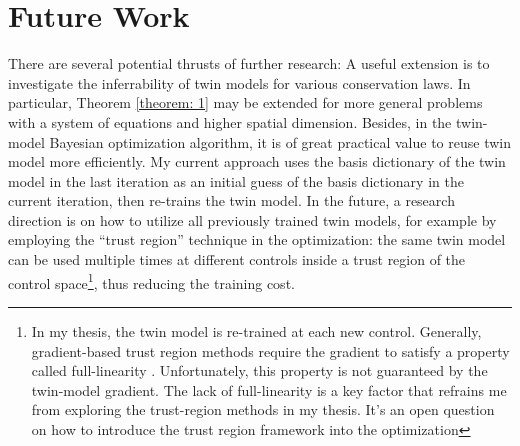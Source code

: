 \section{Future Work}
There are several potential thrusts of further research: 
A useful extension is to investigate the
inferrability of twin models for various conservation laws. In particular,
Theorem \ref{theorem: 1} may be extended for more general problems with a
system of equations and higher spatial dimension. 
Besides, in the twin-model Bayesian optimization algorithm, 
it is of great practical value to reuse twin model more efficiently.
My current approach uses the basis dictionary of the twin model in 
the last iteration as an initial guess
of the basis dictionary in the current iteration,
then re-trains the twin model. In the future, a
research direction is on how to utilize all previously trained twin models,
for example by employing
the ``trust region'' technique in the optimization: the same twin model can be used multiple times
at different controls inside a trust region of the control space\footnote{In my thesis,
the twin model is re-trained at each new control. Generally, gradient-based
trust region methods require the gradient to satisfy a property called full-linearity
\cite{trustregionconn, trustregionwild}.
Unfortunately, this property is not guaranteed 
by the twin-model gradient. The lack of full-linearity is a key factor
that refrains me from exploring the trust-region methods in my thesis. It's an open question
on how to introduce the trust region framework into the optimization}, thus reducing
the training cost.

